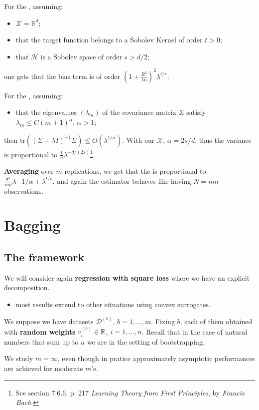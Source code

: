 \documentclass[
11pt,notheorems,hyperref={pdfauthor=whatever}
]{beamer}
\begin{document}
\begin{frame}    
    For the , assuming:
    \begin{itemize}
        \item \(\mathcal{X}=\mathbb{R}^d\);
        \item that the target function belongs to a Sobolev Kernel of order \(t>0\);
        \item that \(\mathcal{H}\) is a Sobolev space of order \(s>d/2\); 
    \end{itemize}
    one gets that the bias term is of order \(\left(1+\frac{R^2}{\lambda n}\right)^2\lambda^{t/s}\). 
    
    For the , assuming:
    \begin{itemize}
        \item that the eigenvalues \((\lambda_m)\) of the covariance matrix \(\Sigma\) satisfy \(\lambda_m\leq C(m+1)^{\alpha}\), \(\alpha>1\);
    \end{itemize} 
    then \(\text{tr}\left(\left(\Sigma+\lambda I\right)^{-1}\Sigma\right)\leq O(\lambda^{1/\alpha})\). With our \(\mathcal{X}\), \(\alpha=2s/d\), thus the variance is proportional to \(\frac{1}{n}\lambda^{-d/(2s)}\)\footnote{See section 7.6.6, p. 217 \textit{Learning Theory from First Principles}, by \textit{Francis Bach}.}.

    \alert{\textbf{Averaging}} over \(m\) replications, we get that the  is proportional to \(\frac{\sigma^2}{nm}\lambda{-1/\alpha}+\lambda^{t/s}\), and again the estimator behaves like having \(N=nm\) observations.
\end{frame}

\section{Bagging}
\subsection{The framework}
\begin{frame}
    We will consider again \alert{\textbf{regression with square loss}} where we have an explicit  decomposition.
    \begin{itemize}
        \item most results extend to other situations using convex surrogates.
    \end{itemize}
    We suppose we have datasets \(\mathcal{D}^{(b)}\), \(b=1,\dots,m\). Fixing \(b\), each of them obtained with \alert{\textbf{random weights}} \(v_i^{(b)}\in\mathbb{R}_+\,i=1,\dots,n\). Recall that in the case of natural numbers that sum up to \(n\) we are in the setting of bootstrapping.

    We study \(m=\infty\), even though in pratice approximately asymptotic performances are achieved for moderate \(m\)'s.
\end{frame}
\end{document}

